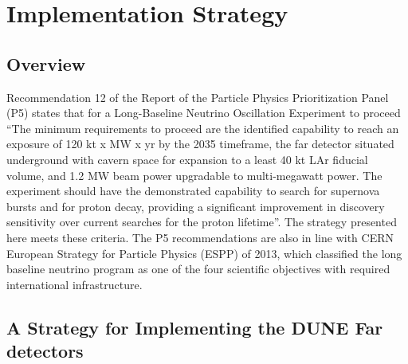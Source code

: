 \chapter{Implementation Strategy}
\label{ch:detectors-strategy}

\section{Overview}

Recommendation 12 of the Report of the Particle Physics Prioritization Panel (P5) 
states that for a Long-Baseline Neutrino Oscillation Experiment to proceed ``The 
minimum requirements to proceed are the identified capability to reach an exposure 
of 120 kt x MW x yr by the 2035 timeframe, the far detector situated underground 
with cavern space for expansion to a least 40 kt LAr fiducial volume, and 1.2 MW 
beam power upgradable to multi-megawatt power. The experiment should have the demonstrated 
capability to search for supernova bursts and for proton decay, providing a significant 
improvement in discovery sensitivity over current searches for the proton lifetime''. 
The strategy presented here meets these criteria. 
The P5 recommendations are also in line with CERN European Strategy for Particle 
Physics (ESPP) of 2013, which classified the long baseline neutrino program as 
one of the four scientific objectives with required international infrastructure.

\section{A Strategy for Implementing the DUNE Far detectors}

